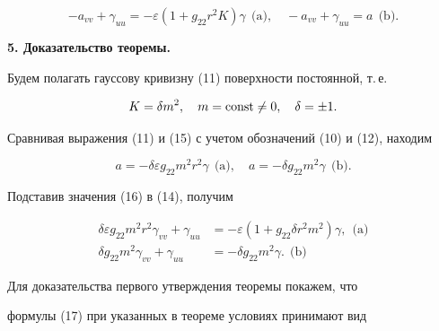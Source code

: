 \begin{equation}


-a_{vv}+\gamma_{uu}=-\varepsilon(1+g_{22}r^2K)


\gamma\ \ \text{(a)},\quad -a_{vv}+\gamma_{uu}=a\ \ \text{(b)}.


\end{equation}





{\bf 5. Доказательство теоремы.} 


Будем полагать гауссову кривизну (11) поверхности постоянной, т.\,е.


\begin{equation}


K=\delta m^2,\quad m=\const\ne0,\quad \delta=\pm1.


\end{equation}


Сравнивая выражения (11) и (15) с учетом обозначений (10) и (12), находим


\begin{equation}


a=-\delta\varepsilon g_{22}m^2r^2\gamma\ \ \text{(a)},\quad


a=-\delta g_{22}m^2\gamma \ \ \text{(b)}.


\end{equation}


Подставив значения (16) в (14), получим


\begin{equation}


\begin{split}


\delta\varepsilon g_{22}m^2r^2\gamma_{vv}+


\gamma_{uu}&=-\varepsilon(1+g_{22}\delta r^2m^2)\gamma,\ \ \text{(a)} \\


\delta g_{22}m^2\gamma_{vv}+\gamma_{uu}


&=-\delta g_{22}m^2\gamma.\ \ \text{(b)}


\end{split}


\end{equation}





Для доказательства первого утверждения теоремы покажем, что


формулы (17) при указанных в теореме условиях принимают вид


